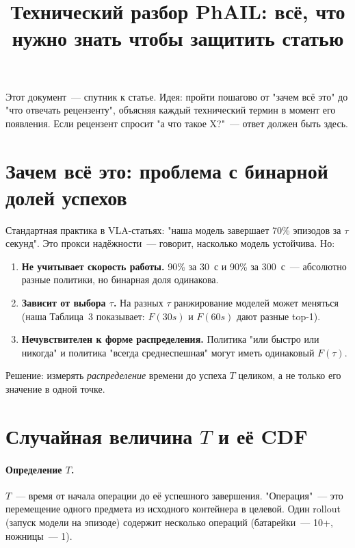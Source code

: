 \documentclass[11pt]{article}
\title{Технический разбор PhAIL: всё, что нужно знать чтобы защитить статью}
\author{}
\date{}
\begin{document}
\maketitle

Этот документ~--- спутник к статье. Идея: пройти пошагово от "зачем всё это" до "что отвечать рецензенту", объясняя каждый технический термин в момент его появления. Если рецензент спросит "а что такое X?"~--- ответ должен быть здесь.

\tableofcontents
\bigskip

\section{Зачем всё это: проблема с бинарной долей успехов}

Стандартная практика в VLA-статьях: "наша модель завершает 70\% эпизодов за $\tau$ секунд". Это прокси надёжности~--- говорит, насколько модель устойчива. Но:

\begin{enumerate}[leftmargin=2em, itemsep=2pt]
\item \textbf{Не учитывает скорость работы.} 90\% за 30~с и 90\% за 300~с~--- абсолютно разные политики, но бинарная доля одинакова.
\item \textbf{Зависит от выбора $\tau$.} На разных $\tau$ ранжирование моделей может меняться (наша Таблица~3 показывает: $F(30s)$ и $F(60s)$ дают разные top-1).
\item \textbf{Нечувствителен к форме распределения.} Политика "или быстро или никогда" и политика "всегда среднеспешная" могут иметь одинаковый $F(\tau)$.
\end{enumerate}

Решение: измерять \emph{распределение} времени до успеха $T$ целиком, а не только его значение в одной точке.

\section{Случайная величина $T$ и её CDF}

\paragraph{Определение $T$.} $T$~--- время от начала операции до её успешного завершения. "Операция"~--- это перемещение одного предмета из исходного контейнера в целевой. Один rollout (запуск модели на эпизоде) содержит несколько операций (батарейки~--- 10+, ножницы~--- 1).
\end{document}

